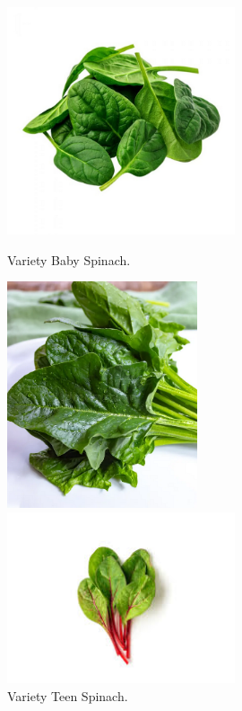\begin{figure}[ht!]
    \centering

    \begin{minipage}[b]{0.45\textwidth}
        \centering
        \includegraphics[width=0.6\textwidth]{img/baby_spinach.png}
        \caption{Variety Baby Spinach.}
        \label{fig:baby}
    \end{minipage}
    \hfill
    \begin{minipage}[b]{0.45\textwidth}
        \centering
        \includegraphics[width=0.5\textwidth]{img/teen_spinach.png}
        \caption{Variety Teen Spinach.}
        \label{fig:teen}
    \end{minipage}
    \begin{minipage}[b]{0.45\textwidth}
        \centering
        \includegraphics[width=0.6\textwidth]{img/red_spinach.jpg}

\end{minipage}
\end{figure}
